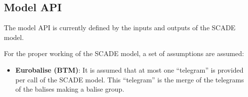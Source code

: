 \subsection{Model API}

The model API is currently defined by the inputs and outputs of the SCADE model.


For the proper working of the SCADE model, a set of assumptions are assumed:
\begin{itemize}
\item \textbf{Eurobalise (BTM)}: It is assumed that at most one
``telegram'' is provided per call of the SCADE model. This
``telegram'' is the merge of the telegrams of the balises making a
balise group.
\end{itemize}

